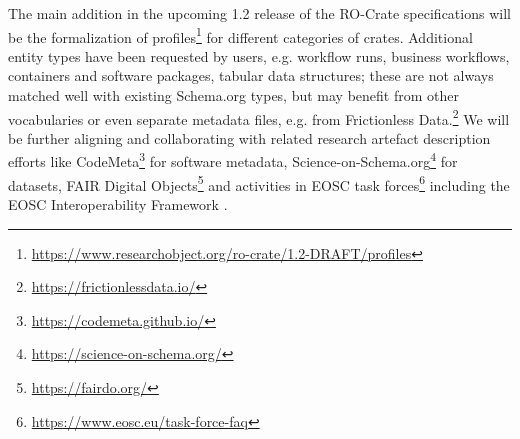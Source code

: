 \documentclass[ds,v1.1.2,openaccess]{iosart2x}%
\begin{document}
The main addition in the upcoming 1.2 release of the RO-Crate
specifications will be the formalization of
profiles\footnote{\url{https://www.researchobject.org/ro-crate/1.2-DRAFT/profiles}}
for different categories of crates. Additional entity types have been
requested by users, e.g. workflow runs, business workflows, containers
and software packages, tabular data structures; these are not always
matched well with existing Schema.org types, but may benefit from other
vocabularies or even separate metadata files, e.g. from Frictionless
Data.\footnote{\url{https://frictionlessdata.io/}} We will be further aligning
and collaborating with related research artefact description efforts
like CodeMeta\footnote{\url{https://codemeta.github.io/}} for software metadata,
Science-on-Schema.org\footnote{\url{https://science-on-schema.org/}}
\cite{doi:10.5281/zenodo.4477164} for datasets, FAIR Digital
Objects\footnote{\url{https://fairdo.org/}} \cite{doi:10.3390/publications8020021} and
activities in EOSC task forces\footnote{\url{https://www.eosc.eu/task-force-faq}}
including the EOSC Interoperability Framework \cite{doi:10.2777/620649}.



\end{document}
